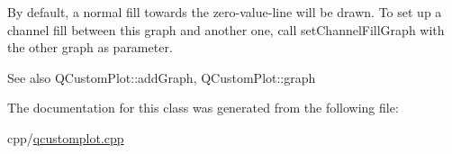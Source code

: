 By default, a normal fill towards the zero-\/value-\/line will be drawn. To set up a channel fill between this graph and another one, call set\+Channel\+Fill\+Graph with the other graph as parameter.

\begin{DoxySeeAlso}{See also}
Q\+Custom\+Plot\+::add\+Graph, Q\+Custom\+Plot\+::graph 
\end{DoxySeeAlso}


The documentation for this class was generated from the following file\+:\begin{DoxyCompactItemize}
\item 
cpp/\mbox{\hyperlink{qcustomplot_8cpp}{qcustomplot.\+cpp}}\end{DoxyCompactItemize}
